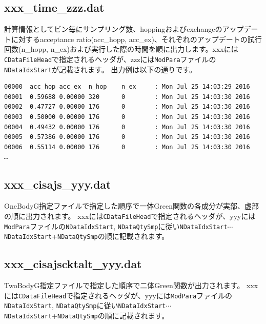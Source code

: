 \subsection{xxx\_time\_zzz.dat }
\label{subsec:time}
計算情報としてビン毎にサンプリング数、hoppingおよびexchangeのアップデートに対するacceptance ratio(acc\_hopp, acc\_ex)、それぞれのアップデートの試行回数(n\_hopp, n\_ex)および実行した際の時間を順に出力します。xxxには\verb|CDataFileHead|で指定されるヘッダが、zzzには\verb|ModPara|ファイルの\verb|NDataIdxStart|が記載されます。
出力例は以下の通りです。\\
\begin{minipage}{15.5cm}
\begin{screen}
\begin{verbatim}
00000  acc_hop acc_ex  n_hop    n_ex     : Mon Jul 25 14:03:29 2016
00001  0.59688 0.00000 320      0        : Mon Jul 25 14:03:30 2016
00002  0.47727 0.00000 176      0        : Mon Jul 25 14:03:30 2016
00003  0.50000 0.00000 176      0        : Mon Jul 25 14:03:30 2016
00004  0.49432 0.00000 176      0        : Mon Jul 25 14:03:30 2016
00005  0.57386 0.00000 176      0        : Mon Jul 25 14:03:30 2016
00006  0.55114 0.00000 176      0        : Mon Jul 25 14:03:30 2016    
…
\end{verbatim}
\end{screen}
\end{minipage}

\subsection{xxx\_cisajs\_yyy.dat }
OneBodyG指定ファイルで指定した順序で一体Green関数の各成分が実部、虚部の順に出力されます。
xxxには\verb|CDataFileHead|で指定されるヘッダが、yyyには\verb|ModPara|ファイルの\verb|NDataIdxStart|, \verb|NDataQtySmp|に従い\verb|NDataIdxStart|$\cdots$\verb|NDataIdxStart|+\verb|NDataQtySmp|の順に記載されます。

\subsection{xxx\_cisajscktalt\_yyy.dat }
TwoBodyG指定ファイルで指定した順序で二体Green関数が出力されます。
xxxには\verb|CDataFileHead|で指定されるヘッダが、yyyには\verb|ModPara|ファイルの\verb|NDataIdxStart|, \verb|NDataQtySmp|に従い\verb|NDataIdxStart|$\cdots$\verb|NDataIdxStart|+\verb|NDataQtySmp|の順に記載されます。
